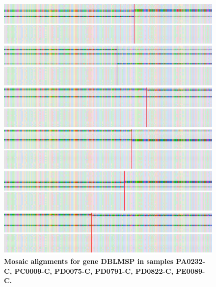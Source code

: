 \documentclass[12pt]{article}
\begin{document}
\begin{figure}
    \centering
    \centerline{\includegraphics[width=1.2\textwidth]{DBLMSP_PA0232-C_PC0009-C_PD0075-C_PD0791-C_PD0822-C_PE0089-C.png}}
    \caption[Mosaic alignments (2)]{
        \textbf{Mosaic alignments for gene DBLMSP in samples PA0232-C, PC0009-C,
        PD0075-C, PD0791-C, PD0822-C, PE0089-C.}
        }
    \label{pa:fig:mosaic_app2}
\end{figure}
\end{document}
